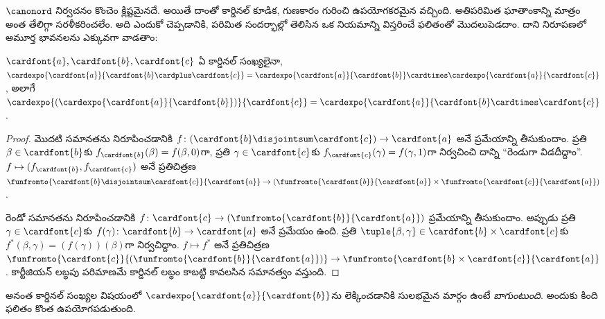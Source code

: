 \documentclass[../../../include/open-logic-section]{subfiles}
\begin{document}


$\canonord$ నిర్వచనం కొంచెం క్లిష్టమైనదే. అయితే దాంతో
కార్డినల్ కూడిక, గుణకారం గురించి ఉపయోగకరమైన
 వచ్చింది. అతిపరిమిత
ఘాతాంకాన్ని మాత్రం అంత తేలిగ్గా సరళీకరించలేం. అది
ఎందుకో చెప్పడానికి, పరిమిత సందర్భాల్లో తెలిసిన ఒక నియమాన్ని
విస్తరించే ఫలితంతో మొదలుపెడదాం. దాని నిరూపణలో అమూర్త
భావనలను ఎక్కువగా వాడతాం:

\begin{prop}
$\cardfont{a}, \cardfont{b}, \cardfont{c}$ ఏ కార్డినల్ సంఖ్యలైనా, $\cardexpo{\cardfont{a}}{\cardfont{b} \cardplus \cardfont{c}} =
\cardexpo{\cardfont{a}}{\cardfont{b}} \cardtimes
\cardexpo{\cardfont{a}}{\cardfont{c}}$, అలాగే $\cardexpo{(\cardexpo{\cardfont{a}}{\cardfont{b}})}{\cardfont{c}} =
\cardexpo{\cardfont{a}}{\cardfont{b} \cardtimes \cardfont{c}}$.
\end{prop}

\begin{proof}
మొదటి సమానతను నిరూపించడానికి $f \colon
(\cardfont{b}\disjointsum\cardfont{c}) \to \cardfont{a}$ అనే ప్రమేయాన్ని తీసుకుందాం. ప్రతి $\beta \in \cardfont{b}$కు $f_\cardfont{b}(\beta) = f(\beta, 0)$గా, ప్రతి $\gamma \in \cardfont{c}$కు $f_\cardfont{c}(\gamma) = f(\gamma, 1)$గా నిర్వచించి దాన్ని ``రెండుగా విడదీద్దాం''. $f \mapsto
(f_{\cardfont{b}}, f_\cardfont{c})$ అనే ప్రతిచిత్రణ $\funfromto{\cardfont{b} \disjointsum \cardfont{c}}{\cardfont{a}} \to
(\funfromto{\cardfont{b}}{\cardfont{a}} \times
\funfromto{\cardfont{c}}{\cardfont{a}})$ .

రెండో సమానతను నిరూపించడానికి $f \colon \cardfont{c} \to
(\funfromto{\cardfont{b}}{\cardfont{a}})$ ప్రమేయాన్ని తీసుకుందాం. అప్పుడు ప్రతి $\gamma \in
\cardfont{c}$కు $f(\gamma) \colon \cardfont{b} \to
\cardfont{a}$ అనే ప్రమేయం ఉంది. ప్రతి $\tuple{\beta, \gamma} \in \cardfont{b} \times \cardfont{c}$కు $f^*(\beta, \gamma) = (f(\gamma))(\beta)$గా నిర్వచిద్దాం. $f \mapsto f^*$ అనే ప్రతిచిత్రణ $\funfromto{\cardfont{c}}{(\funfromto{\cardfont{b}}{\cardfont{a}})}
\to \funfromto{\cardfont{b} \times \cardfont{c}}{\cardfont{a}}$ . కార్టీజియన్ లబ్ధపు పరిమాణమే కార్డినల్ లబ్ధం కాబట్టి కావలసిన సమానత్వం వస్తుంది.
\end{proof}

అనంత కార్డినల్ సంఖ్యల విషయంలో
$\cardexpo{\cardfont{a}}{\cardfont{b}}$ను లెక్కించడానికి
సులభమైన మార్గం ఉంటే \emph{బాగుంటుంది}. అందుకు
కింది ఫలితం కొంత ఉపయోగపడుతుంది.
\end{document}
